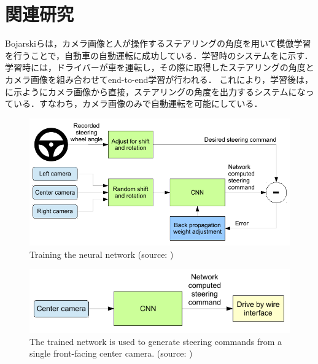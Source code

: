 
\section{関連研究}
     Bojarskiら\cite{bojarski}は，カメラ画像と人が操作するステアリングの角度を用いて模倣学習を行うことで，自動車の自動運転に成功している．学習時のシステムをに示す．学習時には，ドライバーが車を運転し，その際に取得したステアリングの角度とカメラ画像を組み合わせてend-to-end学習が行われる．
     これにより，学習後は，に示ようにカメラ画像から直接，ステアリングの角度を出力するシステムになっている．すなわち，カメラ画像のみで自動運転を可能にしている．
     
     \begin{figure}[h]
          \centering
          \includegraphics[keepaspectratio, scale=1.0] {images/pdf/bojarski_train}
          \caption[Training the neural network]{Training the neural network (source: \cite{bojarski})}
          \label{Fig:bojarski_train}
     \end{figure}



     \begin{figure}[h]
          \centering
          \includegraphics[keepaspectratio, scale=1.10] {images/pdf/bojarski_test}
          \captionsetup{justification=raggedright} %
          \caption[The trained network is used to generate steering commands from a single front-facing center camera.]{The trained network is used to generate steering commands from a single front-facing center camera. (source: \cite{bojarski})}
          \label{Fig:bojarski_test}
     \end{figure}


